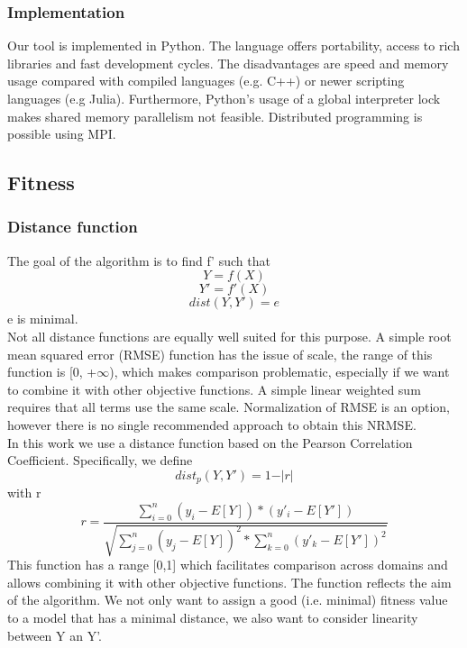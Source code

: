 \subsubsection{Implementation}
Our tool is implemented in Python. The language offers portability, access to rich libraries and fast development cycles. The disadvantages are speed and memory usage compared with compiled languages (e.g. C++) or newer scripting languages (e.g Julia). %
Furthermore, Python's usage of a global interpreter lock makes shared memory parallelism not feasible. Distributed programming is possible using MPI.

\subsection{Fitness}

\subsubsection{Distance function}
The goal of the algorithm is to find f' such that
\[Y = f(X)\]
\[Y' = f'(X)\]
\[dist(Y, Y') = e\]
e is minimal.\\
Not all distance functions are equally well suited for this purpose. A simple root mean squared error (RMSE) function has the issue of scale, the range of this function is [0, +$\infty$), which makes comparison problematic, especially if we want to combine it with other objective functions. A simple linear weighted sum requires that all terms use the same scale. 
Normalization of RMSE is an option, however there is no single recommended approach to obtain this NRMSE. \\
In this work we use a distance function based on the Pearson Correlation Coefficient. Specifically, we define 
\[
dist_p(Y, Y') = 1 - \vert r \vert
\]
with r
\[
r = \frac{\sum_{i=0}^{n}{(y_i-E[Y])*(y'_i-E[Y'])}}{\sqrt{\sum_{j=0}^{n}{(y_j-E[Y])^2}*\sum_{k=0}^{n}{(y'_k-E[Y'])^2}}}
\]
This function has a range [0,1] which facilitates comparison across domains and allows combining it with other objective functions.
The function reflects the aim of the algorithm. We not only want to assign a good (i.e. minimal) fitness value to a model that has a minimal distance, we also want to consider linearity between Y an Y'. 

